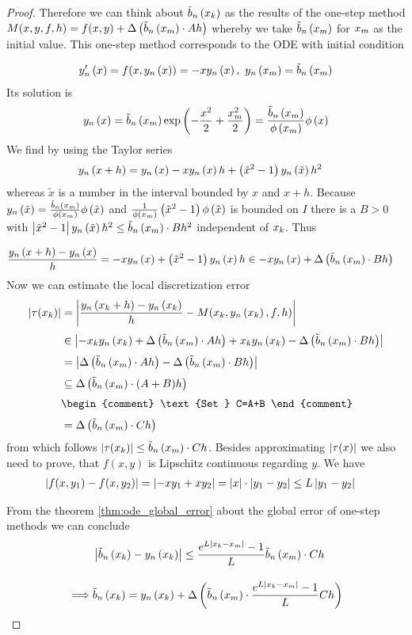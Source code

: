 \begin{proof}
  Therefore we can think about $\bb{\x}$ as the results of the one-step method $M(x,y,f,h)=f(x,y)+\bigabs{\bnp \cdot A h}$ whereby we take $\bnp$ for $\xnp$ as the initial value. This one-step method corresponds to the ODE with initial condition

  \begin{align}
    \dphin{x}=f(x,\phin{x})=-x\phin{x},\ \phin{\xnp} = \bb{\xnp}
  \end{align}
  Its solution is
  \begin{align}
    \phin{x} = \bb{\xnp}\fexp{-\frac{x^2}2+\frac{\xnp^2}2} = \frac{\bb{\xnp}}{\fphi{\xnp}} \fphi{x}
  \end{align}
  We find by using the Taylor series
  \begin{align}
    & \phin{x+h} = \phin{x} -x\phin{x}h+\br{\tilde x^2-1}\phin{\tilde x} h^2
  \end{align}
  whereas $\tilde x$ is a number in the interval bounded by $x$ and $x+h$. Because $\phin{\tilde x} = \frac{\bnp}{\fphi{\xnp}} \fphi{\tilde x}$ and $\frac{1}{\fphi{\xnp}} \br{\tilde x^2-1} \fphi{\tilde x}$ is bounded on $I$ there is a $B > 0$ with $\abs{\tilde x^2-1} \phin{\tilde x} h^2 \le \bnp \cdot B h^2$ independent of $\x[k]$. Thus

  \begin{align}
    \frac{\phin{x+h}-\phin{x}}h &= -x\phin{x}+\br{\tilde x^2-1}\phin{x} h \in -x\phin{x} + \bigabs{\bnp \cdot Bh}
  \end{align}
  Now we can estimate the local discretization error
  \begin{align}
    \abs{\tau(\x)} &= \abs{\frac{\phin{\x[k]+h}-\phin{\x}}h -  M(\x,\phin{\x},f,h)} \nl
    &\in \abs{-\x\phin{\x} + \bigabs{\bnp \cdot Ah} +\x\phin{\x} - \bigabs{\bnp \cdot Bh}} \nl
    &= \abs{\bigabs{\bnp \cdot Ah}-\bigabs{\bnp \cdot Bh}} \nl
    &\subseteq \bigabs{\bnp \cdot (A+B)h} \nl
    &
    \begin{comment}
      \text{Set } C=A+B
    \end{comment} \nl
    &= \bigabs{\bnp \cdot Ch}
  \end{align}
  from which follows $\abs{\tau(\x)} \le \bnp \cdot Ch$. Besides approximating $\abs{\tau(x)}$ we also need to prove, that $f(x,y)$ is Lipschitz continuous regarding $y$. We have
  \begin{align}
    \abs{f(x,y_1)-f(x,y_2)} &= \abs{-xy_1+xy_2} = \abs{x} \cdot \abs{y_1-y_2} \le L \abs{y_1-y_2}
  \end{align}

  \noindent From the theorem \ref{thm:ode_global_error} about the global error of one-step methods we can conclude
  \begin{align}
    & \abs{\bb{\x}-\phin{\x}} \le \frac{\fe{L\abs{\x-\xnp}}-1}L \bnp \cdot Ch \bnl
    \implies & \bb{\x} = \phin{\x} + \bigabs{\bnp \cdot \frac{\fe{L\abs{\x-\xnp}}-1}L Ch}
  \end{align}
\end{proof}

